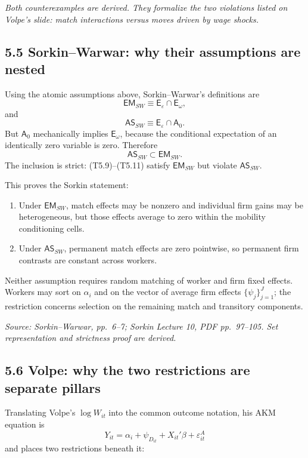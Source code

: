 \documentclass[11pt]{article}
\begin{document}
\textit{Both counterexamples are derived.  They formalize the two violations
listed on Volpe's slide: match interactions versus moves driven by wage
shocks.}

\subsection{5.5 Sorkin--Warwar: why their assumptions are nested}

Using the atomic assumptions above, Sorkin--Warwar's definitions are
\[
\mathsf{EM}_{SW}
\equiv
\mathsf E_\varepsilon\cap\mathsf E_\omega,
\tag{T5.14}
\]
and
\[
\mathsf{AS}_{SW}
\equiv
\mathsf E_\varepsilon\cap\mathsf A_0.
\tag{T5.15}
\]
But \(\mathsf A_0\) mechanically implies \(\mathsf E_\omega\), because the
conditional expectation of an identically zero variable is zero.  Therefore
\[
\boxed{
\mathsf{AS}_{SW}
\subset
\mathsf{EM}_{SW}.
}
\tag{T5.16}
\]
The inclusion is strict: (T5.9)--(T5.11) satisfy
\(\mathsf{EM}_{SW}\) but violate \(\mathsf{AS}_{SW}\).

This proves the Sorkin statement:

\begin{enumerate}
\item Under \(\mathsf{EM}_{SW}\), match effects may be nonzero and individual
  firm gains may be heterogeneous, but those effects average to zero within
  the mobility conditioning cells.
\item Under \(\mathsf{AS}_{SW}\), permanent match effects are zero
  pointwise, so permanent firm contrasts are constant across workers.
\end{enumerate}

Neither assumption requires random matching of worker and firm fixed
effects.  Workers may sort on \(\alpha_i\) and on the vector of average firm
effects \(\{\psi_j\}_{j=1}^J\); the restriction concerns selection on the
remaining match and transitory components.

\textit{Source: Sorkin--Warwar, pp.\ 6--7; Sorkin Lecture 10, PDF
pp.\ 97--105.  Set representation and strictness proof are derived.}

\subsection{5.6 Volpe: why the two restrictions are separate pillars}

Translating Volpe's \(\log W_{it}\) into the common outcome notation, his AKM
equation is
\[
Y_{it}
=
\alpha_i+\psi_{D_{it}}+X_{it}'\beta+\varepsilon^A_{it}
\tag{T5.17}
\]
and places two restrictions beneath it:
\end{document}
